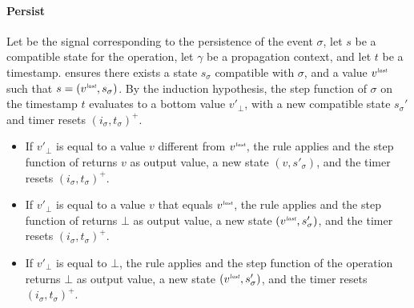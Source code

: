 \begin{skippableproof}
    \paragraph{Persist}
    Let \persist{\sigma} be the signal corresponding to the persistence of the event $\sigma$, let
    $s$ be a compatible state for the operation, let $\gamma$ be a propagation context, and let $t$
    be a timestamp.
     ensures there exists a state $s_\sigma$
    compatible with $\sigma$, and a value $v^{\textit{\tiny last}}$ such that $s = (v^{\textit{\tiny last}}, s_\sigma)$.
    By the induction hypothesis, the step function of $\sigma$ on the timestamp $t$ evaluates to a
    bottom value $v'_\bot$, with a new compatible state $s_\sigma'$ and timer resets $(i_\sigma,
        t_\sigma)^+$.

    \begin{itemize}
        \item If $v'_\bot$ is equal to a value $v$ different from $v^{\textit{\tiny last}}$, the rule
               applies and the step function of
              \persist{\sigma} returns $v$ as output value, a new state $(v, s'_\sigma)$, and the
              timer resets $(i_\sigma, t_\sigma)^+$.

        \item If $v'_\bot$ is equal to a value $v$ that equals $v^{\textit{\tiny last}}$, the rule  applies and the step function of \persist
              {\sigma} returns $\bot$ as output value, a new state $(v^{\textit{\tiny last}}, s'_\sigma)$, and
              the timer resets $(i_\sigma, t_\sigma)^+$.

        \item If $v'_\bot$ is equal to $\bot$, the rule  applies and the step function of the operation \persist{\sigma}
              returns $\bot$ as output value, a new state $(v^{\textit{\tiny last}}, s'_\sigma)$, and
              the timer resets $(i_\sigma, t_\sigma)^+$.
    \end{itemize}


\end{skippableproof}
